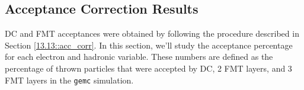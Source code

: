 \subsection{Acceptance Correction Results}
\label{14.20::acceptance_correction_results}
    DC and FMT acceptances were obtained by following the procedure described in Section \ref{13.13::acc_corr}.
    In this section, we'll study the acceptance percentage for each electron and hadronic variable.
    These numbers are defined as the percentage of thrown particles that were accepted by DC, 2 FMT layers, and 3 FMT layers in the \texttt{gemc} simulation.

    
    
